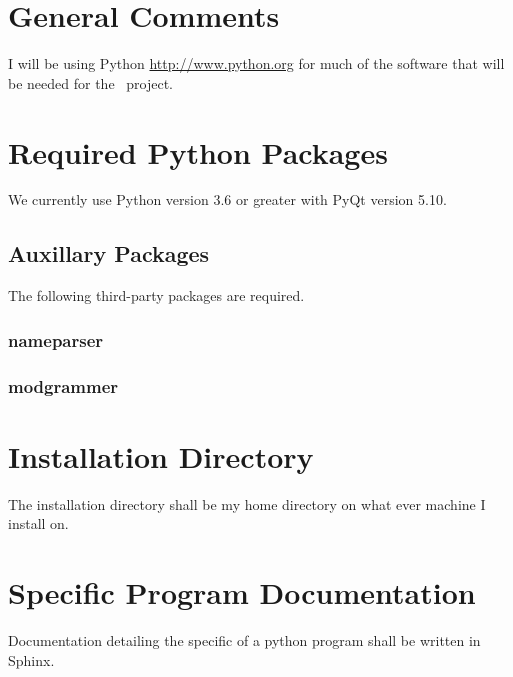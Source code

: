 \section{General Comments}

I will be using Python \url{http://www.python.org} for much of the software
that will be needed for the \ProjectTitle\ project.

\section{Required Python Packages}

We currently use Python version 3.6 or greater with PyQt version 5.10.

\subsection{Auxillary Packages}
The following third-party packages are required.

\subsubsection{nameparser}

\subsubsection{modgrammer}

\section{Installation Directory}

The installation directory shall be my home directory on what ever machine
I install on.

\section{Specific Program Documentation}

Documentation detailing the specific of a python program shall be written in Sphinx.


